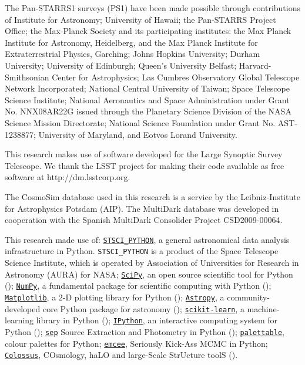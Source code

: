 \documentclass[fleqn,usenatbib,useAMS,english]{mnras}
\begin{document}
  The Pan-STARRS1 surveys (PS1) have been made possible through contributions of
  Institute for Astronomy; University of Hawaii; the Pan-STARRS Project Office;
  the Max-Planck Society and its participating institutes: the Max Planck Institute
  for Astronomy, Heidelberg, and the Max Planck Institute for Extraterrestrial Physics,
  Garching; Johns Hopkins University; Durham University; University of Edinburgh;
  Queen's University Belfast; Harvard-Smithsonian Center for Astrophysics; Las
  Cumbres Observatory Global Telescope Network Incorporated; National Central
  University of Taiwan; Space Telescope Science Institute; National Aeronautics
  and Space Administration under Grant No. NNX08AR22G issued through the Planetary
  Science Division of the NASA Science Mission Directorate; National Science
  Foundation under Grant No. AST-1238877; University of Maryland, and Eotvos
  Lorand University.

  This research makes use of software developed for the Large Synoptic Survey
  Telescope. We thank the LSST project for making their code available as free
  software at http://dm.lsstcorp.org.

  The CosmoSim database used in this research is a service by the Leibniz-Institute for
  Astrophysics Potsdam (AIP).
  The MultiDark database was developed in cooperation with the Spanish MultiDark
  Consolider Project CSD2009-00064.

  This research made use of:
  \href{http://www.stsci.edu/institute/software_hardware/pyraf/stsci\_python}{\texttt{STSCI\_PYTHON}},
      a general astronomical data analysis infrastructure in Python.
      \texttt{STSCI\_PYTHON} is a product of the Space Telescope Science Institute,
      which is operated by Association of Universities for Research
      in Astronomy (AURA) for NASA;
  \href{http://www.scipy.org/}{\texttt{SciPy}},
      an open source scientific tool for Python (\citealt{SciPy});
  \href{http://www.numpy.org/}{\texttt{NumPy}},
      a fundamental package for scientific computing with Python (\citealt{NumPy});
  \href{http://matplotlib.org/}{\texttt{Matplotlib}},
      a 2-D plotting library for Python (\citealt{Matplotlib});
  \href{http://www.astropy.org/}{\texttt{Astropy}}, a community-developed
      core Python package for astronomy (\citealt{AstroPy});
  \href{http://scikit-learn.org/stable/index.html}{\texttt{scikit-learn}},
      a machine-learning library in Python (\citealt{scikit-learn});
  \href{https://ipython.org}{\texttt{IPython}},
      an interactive computing system for Python (\citealt{IPython});
  \href{https://github.com/kbarbary/sep}{\texttt{sep}}
      Source Extraction and Photometry in Python (\citealt{PythonSEP});
  \href{https://jiffyclub.github.io/palettable/}{\texttt{palettable}},
      colour palettes for Python;
  \href{http://dan.iel.fm/emcee/current/}{\texttt{emcee}},
      Seriously Kick-Ass MCMC in Python;
  \href{http://bdiemer.bitbucket.org/}{\texttt{Colossus}},
      COsmology, haLO and large-Scale StrUcture toolS (\citealt{Colossus}).
\end{document}
